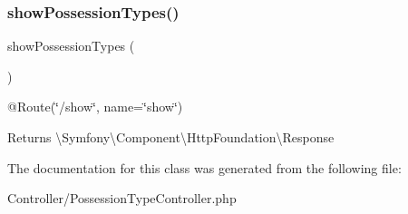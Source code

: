 \subsubsection{\texorpdfstring{showPossessionTypes()}{showPossessionTypes()}}
{\footnotesize\ttfamily show\+Possession\+Types (\begin{DoxyParamCaption}{ }\end{DoxyParamCaption})}

@\+Route(\char`\"{}/show\char`\"{}, name=\char`\"{}show\char`\"{}) \begin{DoxyReturn}{Returns}
\textbackslash{}\+Symfony\textbackslash{}\+Component\textbackslash{}\+Http\+Foundation\textbackslash{}\+Response 
\end{DoxyReturn}


The documentation for this class was generated from the following file\+:\begin{DoxyCompactItemize}
\item 
Controller/Possession\+Type\+Controller.\+php\end{DoxyCompactItemize}
